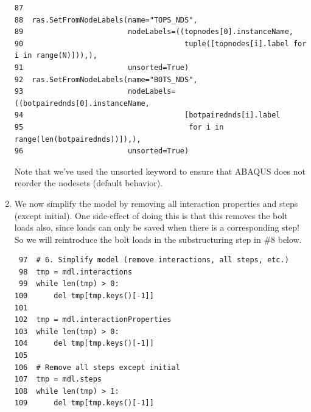 \documentclass[11pt]{article}
\begin{document}
\begin{enumerate}
\begin{verbatim}
87  
88  ras.SetFromNodeLabels(name="TOPS_NDS", 
89                        nodeLabels=((topnodes[0].instanceName, 
90                                     tuple([topnodes[i].label for i in range(N)])),),
91                        unsorted=True)
92  ras.SetFromNodeLabels(name="BOTS_NDS", 
93                        nodeLabels=((botpairednds[0].instanceName, 
94                                     [botpairednds[i].label
95                                      for i in range(len(botpairednds))]),),
96                        unsorted=True)
\end{verbatim}
Note that we've used the unsorted keyword to ensure that ABAQUS does not reorder the nodesets (default behavior).
\item We now simplify the model by removing all interaction properties and steps (except initial).
One side-effect of doing this is that this removes the bolt loads also, since loads can only be saved when there is a corresponding step!
So we will reintroduce the bolt loads in the substructuring step in \#8 below.
\begin{verbatim}
 97  # 6. Simplify model (remove interactions, all steps, etc.)
 98  tmp = mdl.interactions
 99  while len(tmp) > 0:
100      del tmp[tmp.keys()[-1]]
101  
102  tmp = mdl.interactionProperties
103  while len(tmp) > 0:
104      del tmp[tmp.keys()[-1]]
105  
106  # Remove all steps except initial
107  tmp = mdl.steps
108  while len(tmp) > 1:
109      del tmp[tmp.keys()[-1]]
\end{verbatim}
\end{enumerate}
\end{document}

